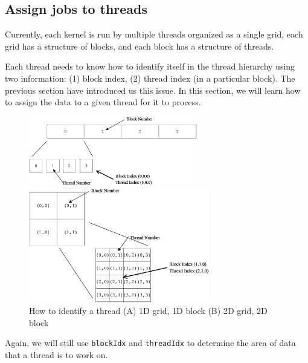 \subsection{Assign jobs to threads}
\label{sec:assign-jobs-threads}

Currently, each kernel is run by multiple threads organized as a single grid,
each grid has a structure of blocks, and each block has a structure of threads.


Each thread needs to know how to identify itself in the thread hierarchy using
two information: (1) block index, (2) thread index (in a particular block). The
previous section have introduced us this issue. In this section, we will learn
how to assign the data to a given thread for it to process.

\begin{figure}[hbt]
  \centerline{\includegraphics[height=3cm,
    angle=0]{./images/cuda_threadidx.eps}}
  \centerline{\includegraphics[height=5cm,
      angle=0]{./images/cuda_threadidx2.eps}}
  \caption{How to identify a thread (A) 1D grid, 1D block (B) 2D grid,
    2D block}
\label{fig:cuda_threadidx}
\end{figure}

Again, we will still use \verb!blockIdx! and \verb!threadIdx! to
determine the area of data that a thread is to work on. 


